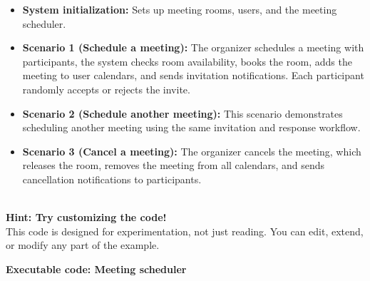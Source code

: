 \begin{itemize}
\item
\protect{}\label{51dwxmyGGHy6UgRwdB1Tu}
\textbf{System initialization:} Sets up meeting rooms, users, and the meeting scheduler.
\item
\protect{}\label{ailIzXebJbC-skik3KLzo}
\textbf{Scenario 1 (Schedule a meeting):} The organizer schedules a meeting with participants, the system checks room availability, books the room, adds the meeting to user calendars, and sends invitation notifications. Each participant randomly accepts or rejects the invite.
\item
\protect{}\label{x6V6rmHEefs9-L0zvEQON}
\textbf{Scenario 2 (Schedule another meeting):} This scenario demonstrates scheduling another meeting using the same invitation and response workflow.
\item
\protect{}\label{ZMfdeb299a5W014Q6l7VS}
\textbf{Scenario 3 (Cancel a meeting):} The organizer cancels the meeting, which releases the room, removes the meeting from all calendars, and sends cancellation notifications to participants.
\end{itemize}
\\
\textbf{Hint: Try customizing the code!}
\\
This code is designed for experimentation, not just reading. You can edit, extend, or modify any part of the example.

\textbf{Executable code: Meeting scheduler}


